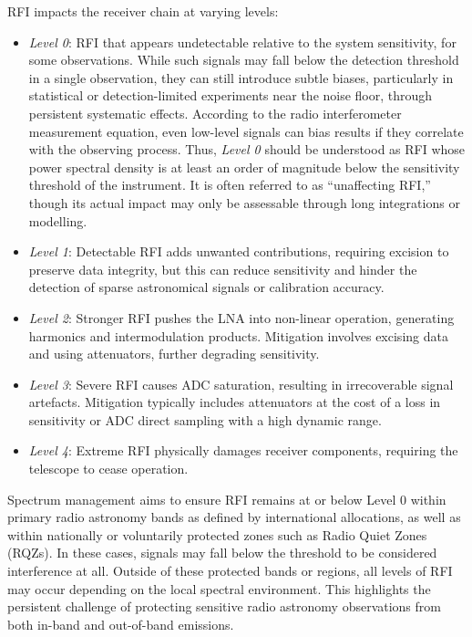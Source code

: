 RFI impacts the receiver chain at varying levels:
\begin{itemize}
\item \emph{Level 0}: RFI that appears undetectable relative to the system sensitivity, for some observations. While such signals may fall below the detection threshold in a single observation, they can still introduce subtle biases, particularly in statistical or detection-limited experiments near the noise floor, through persistent systematic effects. According to the radio interferometer measurement equation, even low-level signals can bias results if they correlate with the observing process. Thus, \emph{Level 0} should be understood as RFI whose power spectral density is at least an order of magnitude below the sensitivity threshold of the instrument. It is often referred to as “unaffecting RFI,” though its actual impact may only be assessable through long integrations or modelling.
\item \emph{Level 1}: Detectable RFI adds unwanted contributions, requiring excision to preserve data integrity, but this can reduce sensitivity and hinder the detection of sparse astronomical signals or calibration accuracy.
\item \emph{Level 2}: Stronger RFI pushes the LNA into non-linear operation, generating harmonics and intermodulation products. Mitigation involves excising data and using attenuators, further degrading sensitivity.
\item \emph{Level 3}: Severe RFI causes ADC saturation, resulting in irrecoverable signal artefacts. Mitigation typically includes attenuators at the cost of a loss in sensitivity or ADC direct sampling with a high dynamic range.
\item \emph{Level 4}: Extreme RFI physically damages receiver components, requiring the telescope to cease operation.
\end{itemize}
Spectrum management aims to ensure RFI remains at or below Level 0 within primary radio astronomy bands as defined by international allocations, as well as within nationally or voluntarily protected zones such as Radio Quiet Zones (RQZs). In these cases, signals may fall below the threshold to be considered interference at all. Outside of these protected bands or regions, all levels of RFI may occur depending on the local spectral environment. This highlights the persistent challenge of protecting sensitive radio astronomy observations from both in-band and out-of-band emissions.



